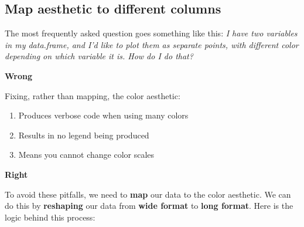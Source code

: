 \documentclass[]{book}
\newenvironment{Shaded}{\begin{snugshade}}{\end{snugshade}}
\newcommand{\KeywordTok}[1]{\textcolor[rgb]{0.13,0.29,0.53}{\textbf{#1}}}
\newcommand{\DataTypeTok}[1]{\textcolor[rgb]{0.13,0.29,0.53}{#1}}
\newcommand{\StringTok}[1]{\textcolor[rgb]{0.31,0.60,0.02}{#1}}
\newcommand{\OperatorTok}[1]{\textcolor[rgb]{0.81,0.36,0.00}{\textbf{#1}}}
\newcommand{\NormalTok}[1]{#1}
\providecommand{\tightlist}{%
  \setlength{\itemsep}{0pt}\setlength{\parskip}{0pt}}
\begin{document}
\subsection{Map aesthetic to different
columns}\label{map-aesthetic-to-different-columns}

The most frequently asked question goes something like this: \emph{I
have two variables in my data.frame, and I'd like to plot them as
separate points, with different color depending on which variable it is.
How do I do that?}

\textbf{Wrong}

Fixing, rather than mapping, the color aesthetic:

\begin{enumerate}
\def\labelenumi{\arabic{enumi}.}
\tightlist
\item
  Produces verbose code when using many colors
\item
  Results in no legend being produced
\item
  Means you cannot change color scales
\end{enumerate}

\begin{Shaded}
\end{Shaded}

\textbf{Right}

To avoid these pitfalls, we need to \textbf{map} our data to the color
aesthetic. We can do this by \textbf{reshaping} our data from
\textbf{wide format} to \textbf{long format}. Here is the logic behind
this process:
\end{document}
